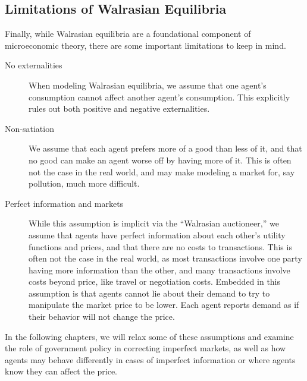 \subsection*{Limitations of Walrasian Equilibria}
Finally, while Walrasian equilibria are a foundational component of microeconomic theory, there are some important limitations to keep in mind.
\begin{description}
    \item[No externalities] When modeling Walrasian equilibria, we assume that one agent's consumption cannot affect another agent's consumption. This explicitly rules out both positive and negative externalities.
    \item[Non-satiation] We assume that each agent prefers more of a good than less of it, and that no good can make an agent worse off by having more of it. This is often not the case in the real world, and may make modeling a market for, say pollution, much more difficult.
    \item[Perfect information and markets] While this assumption is implicit via the ``Walrasian auctioneer,'' we assume that agents have perfect information about each other's utility functions and prices, and that there are no costs to transactions. This is often not the case in the real world, as most transactions involve one party having more information than the other, and many transactions involve costs beyond price, like travel or negotiation costs. Embedded in this assumption is that agents cannot lie about their demand to try to manipulate the market price to be lower. Each agent reports demand as if their behavior will not change the price.  
\end{description}
In the following chapters, we will relax some of these assumptions and examine the role of government policy in correcting imperfect markets, as well as how agents may behave differently in cases of imperfect information or where agents know they can affect the price. 
